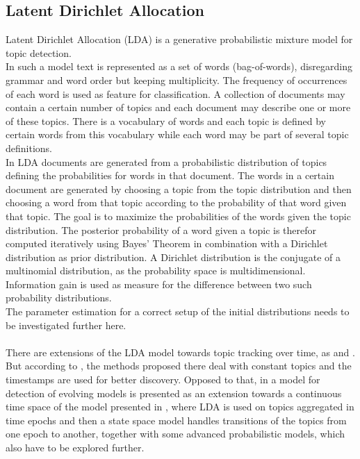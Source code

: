 \subsection{Latent Dirichlet Allocation}\label{sec:LDA}

Latent Dirichlet Allocation (LDA) \cite{Blei:2003:LDA:944919.944937}
 is a generative probabilistic mixture model for topic detection.
\\
In such a model text is represented as a set of words (bag-of-words), disregarding grammar and word order but keeping multiplicity. The frequency of occurrences of each word is used as feature for classification. A collection of documents may contain a certain number of topics and each document may describe one or more of these topics. There is a vocabulary of words and each topic is defined by certain words from this vocabulary while each word may be part of several topic definitions.
\\
In LDA documents are generated from a probabilistic distribution of topics defining the probabilities for words in that document. The words in a certain document are generated by choosing a topic from the topic distribution and then choosing a word from that topic according to the probability of that word given that topic. The goal is to maximize the probabilities of the words given the topic distribution.
The posterior probability of a word given a topic is therefor computed iteratively using Bayes' Theorem in combination with a Dirichlet distribution as prior distribution. A Dirichlet distribution is the conjugate of a multinomial distribution, as the probability space is multidimensional. Information gain is used as measure for the difference between two such probability distributions.
\\
The parameter estimation for a correct setup of the initial distributions needs to be investigated further here.
\\
\\
There are extensions of the LDA model towards topic tracking over time, as \cite{Wang:2006:TOT:1150402.1150450} and \cite{conf:ijcai:WeiSW07}. But according to \cite{conf:uai:WangBH08}, the methods proposed there deal with constant topics and the timestamps are used for better discovery. Opposed to that, in \cite{conf:uai:WangBH08} a model for detection of evolving models is presented as an extension towards a continuous time space of the model presented in \cite{Blei:2006:DTM:1143844.1143859}, where LDA is used on topics aggregated in time epochs and then a state space model handles transitions of the topics from one epoch to another, together with some advanced probabilistic models, which also have to be explored further.


